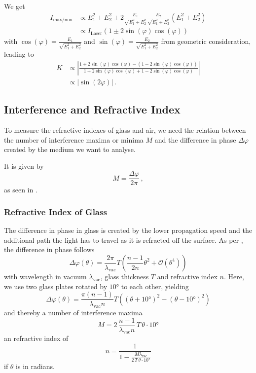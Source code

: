 We get
\begin{align*}
    I_{\text{max}/\text{min}} &\propto E^2_1 +E^2_2 \pm 2 \frac{E_1}{\sqrt{E^2_1 + E^2_2}} \frac{E_2}{\sqrt{E^2_1 + E^2_2}} (E^2_1+E^2_2) \\
    &\propto I_\text{Laser} (1 \pm 2 \sin(\varphi) \cos(\varphi))
\end{align*}
with $\cos(\varphi) = \frac{E_1}{\sqrt{E^2_1 + E^2_2}}$ and $\sin(\varphi) = \frac{E_2}{\sqrt{E^2_1 + E^2_2}}$ from geometric consideration,
leading to
\begin{align}
    K &\propto \left| \frac{1 + 2 \sin(\varphi) \cos(\varphi) - (1 - 2 \sin(\varphi) \cos(\varphi))}{1 + 2 \sin(\varphi) \cos(\varphi) + 1 - 2 \sin(\varphi) \cos(\varphi)}\right| \nonumber\\
      &\propto |\sin(2 \varphi)| \,.
      \label{eq:contrastprop}
\end{align}


\subsection{Interference and Refractive Index}
\label{subsec:intrefrac}

To measure the refractive indexes of glass and air, we need the relation between the number of interference maxima or minima $M$ and the difference in phase $\Delta\varphi$
created by the medium we want to analyse.

It is given by
\begin{equation}
    M = \frac{\Delta \varphi}{2 \pi}\,,
    \label{eq:intmax}
\end{equation} 
as seen in \cite{v64}.

\subsubsection{Refractive Index of Glass}

The difference in phase in glass is created by the lower propagation speed and the additional path the light has to travel as it is refracted off the surface.
As per \cite{v64}, the difference in phase follows
\begin{equation*}
    \Delta \varphi (\theta) = \frac{2 \pi}{\lambda_\text{vac}} T \left(\frac{n-1}{2n} \theta^2 + \mathcal{O}(\theta^4) \right)
\end{equation*}
with wavelength in vacuum $\lambda_\text{vac}$, glass thickness $T$ and refractive index $n$.
Here, we use two glass plates rotated by $10°$ to each other, yielding
\begin{equation*}
    \Delta \varphi(\theta) = \frac{\pi (n-1)}{\lambda_\text{vac} n}T \left((\theta + 10°)^2 - (\theta - 10°)^2\right)
\end{equation*}
and thereby a number of interference maxima
\begin{equation*}
    M = 2 \, \frac{n-1}{\lambda_\text{vac} n} \, T \, \theta \cdot 10°
\end{equation*}
an refractive index of
\begin{equation}
    n = \frac{1}{1 - \frac{M \lambda_\text{vac}}{2 \, T \, \theta \cdot 10°}}
    \label{eq:refractiveindexglass}
\end{equation}
if $\theta$ is in radians.

